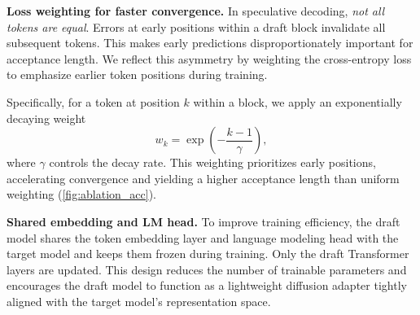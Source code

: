 \textbf{Loss weighting for faster convergence.  } In speculative decoding, \textit{not all tokens are equal}. Errors at early positions within a draft block invalidate all subsequent tokens. This makes early predictions disproportionately important for acceptance length. We reflect this asymmetry by weighting the cross-entropy loss to emphasize earlier token positions during training.

Specifically, for a token at position $k$ within a block, we apply an exponentially decaying weight
\begin{equation}
\label{eq:loss-decay}
    w_k = \exp\!\left(-\frac{k-1}{\gamma}\right),
\end{equation}
where $\gamma$ controls the decay rate. This weighting prioritizes early positions, accelerating convergence and yielding a higher acceptance length than uniform weighting (\autoref{fig:ablation_acc}).

\textbf{Shared embedding and LM head.  } To improve training efficiency, the draft model shares the token embedding layer and language modeling head with the target model and keeps them frozen during training. Only the draft Transformer layers are updated. This design reduces the number of trainable parameters and encourages the draft model to function as a lightweight diffusion adapter tightly aligned with the target model's representation space.
